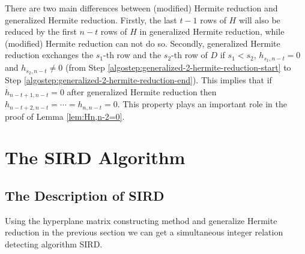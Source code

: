 \documentclass{sig-alternate}
\numberwithin{theorem}{section} \numberwithin{equation}{section}
\begin{document}
\begin{rem}\label{rem:generalized-Hermite-reduction}
 There are two main differences between
(modified) Hermite reduction and  generalized Hermite reduction.
Firstly, the last $t-1$ rows of $H$ will also be reduced by the
first $n-t$ rows of $H$ in generalized Hermite reduction, while
(modified) Hermite reduction can not do so. Secondly, generalized
Hermite reduction exchanges the $s_1$-th row and the $s_2$-th row of
$D$ if $s_1 < s_2$, $h_{s_1, n-t} = 0$ and $h_{s_2, n-t} \neq 0$
(from Step \ref{algostep:generalized-2-hermite-reduction-start} to
Step \ref{algostep:generalized-2-hermite-reduction-end}). This
implies that if $h_{n-t+1, n-t}= 0$ after  generalized Hermite
reduction then $h_{n-t+2, n-t} = \cdots = h_{n, n-t} = 0$. This
property plays an important role in the proof of Lemma
\ref{lem:Hn,n-2=0}.
\end{rem}

\section{The SIRD Algorithm}\label{sec:The SIRD algorithm}
\subsection{The Description of SIRD}
\label{subsec:The algorithm description} Using the hyperplane matrix
constructing method and generalize Hermite reduction in the previous
section we can get a simultaneous integer relation detecting
algorithm SIRD.
\end{document}
